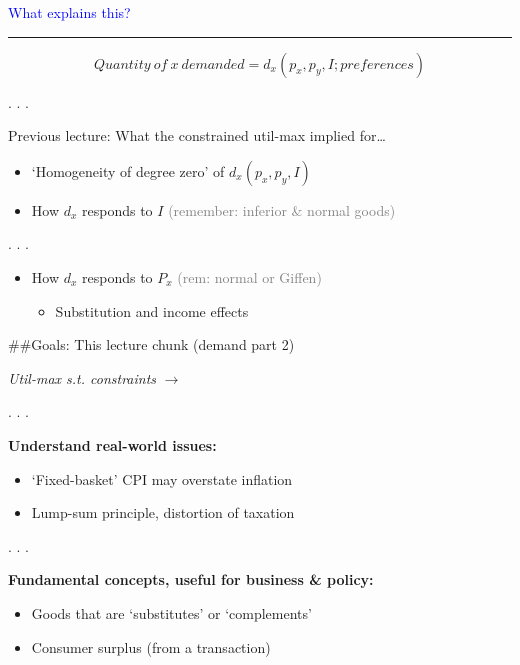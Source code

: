 \documentclass[]{article}
\providecommand{\tightlist}{%
  \setlength{\itemsep}{0pt}\setlength{\parskip}{0pt}}
\begin{document}
\textcolor{blue}{What explains this?}

\begin{center}\rule{0.5\linewidth}{\linethickness}\end{center}

\[Quantity \: of \: x \: demanded = d_x(p_x, p_y, I; preferences)\]

. . .

Previous lecture: What the constrained util-max implied for\ldots{}

\begin{itemize}
\item
  `Homogeneity of degree zero' of \(d_x(p_x, p_y, I)\)
\item
  How \(d_x\) responds to \(I\)
  \textcolor{gray}{(remember: inferior \& normal goods)}
\end{itemize}

. . .

\begin{itemize}
\item
  How \(d_x\) responds to \(P_x\)
  \textcolor{gray}{(rem: normal or Giffen)}

  \begin{itemize}
  \tightlist
  \item
    Substitution and income effects
  \end{itemize}
\end{itemize}

\#\#Goals: This lecture chunk (demand part 2)

\emph{Util-max s.t. constraints} \(\rightarrow\)

. . .

\textbf{Understand real-world issues:}

\begin{itemize}
\item
  `Fixed-basket' CPI may overstate inflation
\item
  Lump-sum principle, distortion of taxation
\end{itemize}

. . .

\textbf{Fundamental concepts, useful for business \& policy:}

\begin{itemize}
\item
  Goods that are `substitutes' or `complements'
\item
  Consumer surplus (from a transaction)
\end{itemize}
\end{document}
